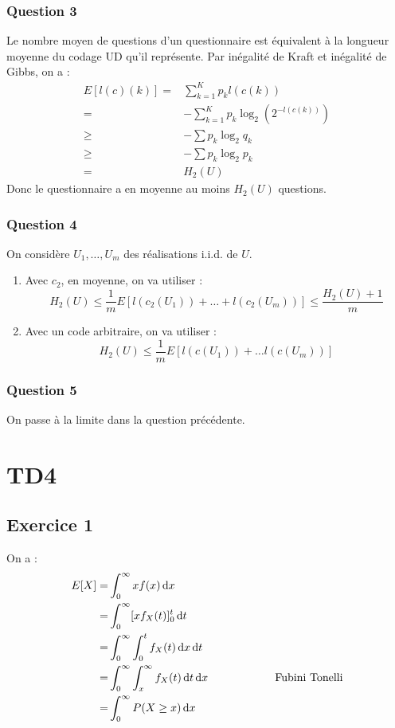 \documentclass{cours}
\begin{document}
\subsubsection{Question 3}
Le nombre moyen de questions d'un questionnaire est équivalent à la longueur moyenne du codage UD qu'il représente. Par inégalité de Kraft et inégalité de Gibbs, on a : 
\[
    \begin{aligned}
        E[l(c)(k)] =& \sum_{k = 1}^{K}p_{k}l(c(k))\\
        =& -\sum_{k = 1}^{K}p_{k}\log_{2}(2^{-l(c(k))})\\
        \geq & -\sum p_{k}\log_{2}q_{k}\\
        \geq & -\sum p_{k}\log_{2}p_{k} \\
        = & H_{2}(U)
    \end{aligned}
\]
Donc le questionnaire a en moyenne au moins $H_{2}(U)$ questions. 

\subsubsection{Question 4}
On considère $U_{1},\ldots, U_{m}$ des réalisations i.i.d. de $U$. 
\begin{enumerate}
\item Avec $c_{2}$, en moyenne, on va utiliser : 
\[
    H_{2}(U) \leq \frac{1}{m}E[l(c_{2}(U_{1})) + \ldots + l(c_{2}(U_{m}))] \leq \frac{H_{2}(U) + 1}{m}
\]
\item Avec un code arbitraire, on va utiliser : 
\[
    H_{2}(U) \leq \frac{1}{m}E[l(c(U_{1})) + \ldots l(c(U_{m}))]
\]
\end{enumerate}


\subsubsection{Question 5}
On passe à la limite dans la question précédente. 

\section{TD4}
\subsection{Exercice 1}
On a : 
\[
	\begin{aligned}
		E[X] =& \int_{0}^{\infty}xf(x){\rm \, d} x\\
		=& \int_{0}^{\infty}[xf_{X}(t)]_{0}^{t}{\rm \, d} t\\
		=& \int_{0}^{\infty}\int_{0}^{t}f_{X}(t){\rm \, d} x {\rm \, d} t\\
		=& \int_{0}^{\infty}\int_{x}^{\infty}f_{X}(t){\rm \, d} t{\rm \, d} x \text{\hspace{2cm} Fubini Tonelli}\\
		=& \int_{0}^{\infty}P(X\geq x){\rm \, d} x
	\end{aligned}
\]
\end{document}
